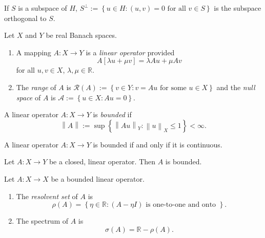 \begin{definition}
  \label{definition-orthogonal-subspace}
  If \( S \) is a subspace of \( H \), \( S^{\perp} := \left\lbrace u \in H: (u, v) = 0 \text{ for all } v \in S \right\rbrace \) is the subspace orthogonal to \( S \).
\end{definition}

\begin{definition}
  \label{definition-linear-operator}
  \label{definition-range}
  \label{definition-null-space}
  Let \( X \) and \( Y \) be real Banach spaces.
  \begin{enumerate}
    \item A mapping \( A: X \to Y \) is a \emph{linear operator} provided
          \[
            A [\lambda u + \mu v] = \lambda A u + \mu A v
          \]
          for all \( u, v \in X \), \( \lambda, \mu \in \mathbb{R} \).
    \item The \emph{range} of \( A \) is \( \mathcal{R}(A) := \left\lbrace v \in Y: v = Au \text{ for some } u \in X \right\rbrace \) and the \emph{null space} of \( A \) is \( \mathcal{A} := \left\lbrace u \in X: Au = 0 \right\rbrace \).
  \end{enumerate}
\end{definition}

\begin{definition}
  \label{definition-Banach-space-linear-operator-bounded}
  A linear operator \( A: X \to Y \) is \emph{bounded} if
  \[
    \left\lVert A \right\rVert := \sup \left\lbrace \left\lVert Au \right\rVert_Y: \left\lVert u \right\rVert_X \leq 1 \right\rbrace < \infty.
  \]
\end{definition}

\begin{proposition}
  \label{proposition-linear-operator-continuous-iff-bounded}
  A linear operator \( A: X \to Y \) is bounded if and only if it is continuous.
\end{proposition}

\begin{theorem}
  \label{theorem-closed-graph-theorem}
  Let \( A: X \to Y \) be a closed, linear operator.
  Then \( A \) is bounded.
\end{theorem}

\begin{definition}
  \label{definition-resolvent-set}
  Let \( A: X \to X \) be a bounded linear operator.
  \begin{enumerate}
    \item The \emph{resolvent set} of \( A \) is
          \[
            \rho(A) = \left\lbrace \eta \in \mathbb{R}: (A - \eta I) \text{ is one-to-one and onto } \right\rbrace.
          \]
    \item The spectrum of \( A \) is
          \[
            \sigma(A) = \mathbb{R} - \rho(A).
          \]
  \end{enumerate}
\end{definition}

